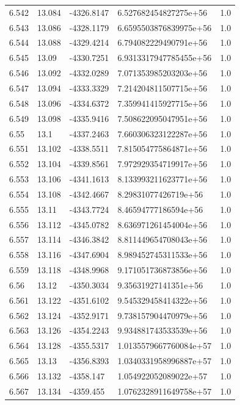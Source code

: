 \begin{tabular}{lllll}
6.542 & 13.084 & -4326.8147 & 6.527682454827275e+56 & 1.0 \\
6.543 & 13.086 & -4328.1179 & 6.6595503876839975e+56 & 1.0 \\
6.544 & 13.088 & -4329.4214 & 6.794082229490791e+56 & 1.0 \\
6.545 & 13.09 & -4330.7251 & 6.9313317947785455e+56 & 1.0 \\
6.546 & 13.092 & -4332.0289 & 7.071353985203203e+56 & 1.0 \\
6.547 & 13.094 & -4333.3329 & 7.214204811507715e+56 & 1.0 \\
6.548 & 13.096 & -4334.6372 & 7.359941415927715e+56 & 1.0 \\
6.549 & 13.098 & -4335.9416 & 7.508622095047951e+56 & 1.0 \\
6.55 & 13.1 & -4337.2463 & 7.660306323122287e+56 & 1.0 \\
6.551 & 13.102 & -4338.5511 & 7.815054775864871e+56 & 1.0 \\
6.552 & 13.104 & -4339.8561 & 7.972929354719917e+56 & 1.0 \\
6.553 & 13.106 & -4341.1613 & 8.133993211623771e+56 & 1.0 \\
6.554 & 13.108 & -4342.4667 & 8.29831077426719e+56 & 1.0 \\
6.555 & 13.11 & -4343.7724 & 8.46594777186594e+56 & 1.0 \\
6.556 & 13.112 & -4345.0782 & 8.636971261454004e+56 & 1.0 \\
6.557 & 13.114 & -4346.3842 & 8.811449654708043e+56 & 1.0 \\
6.558 & 13.116 & -4347.6904 & 8.989452745311533e+56 & 1.0 \\
6.559 & 13.118 & -4348.9968 & 9.171051736873856e+56 & 1.0 \\
6.56 & 13.12 & -4350.3034 & 9.35631927141351e+56 & 1.0 \\
6.561 & 13.122 & -4351.6102 & 9.545329458414322e+56 & 1.0 \\
6.562 & 13.124 & -4352.9171 & 9.738157904470979e+56 & 1.0 \\
6.563 & 13.126 & -4354.2243 & 9.934881743533539e+56 & 1.0 \\
6.564 & 13.128 & -4355.5317 & 1.0135579667760084e+57 & 1.0 \\
6.565 & 13.13 & -4356.8393 & 1.0340331958996887e+57 & 1.0 \\
6.566 & 13.132 & -4358.147 & 1.054922052089022e+57 & 1.0 \\
6.567 & 13.134 & -4359.455 & 1.0762328911649758e+57 & 1.0 \\

\end{tabular}
